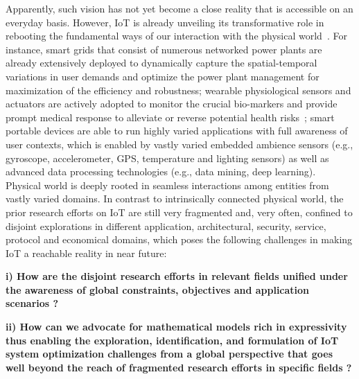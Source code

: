  Apparently, such vision has not yet become a close reality that is accessible on an everyday basis. However, IoT is already unveiling its transformative role in rebooting the fundamental ways of our interaction with the physical world~\cite{stankovic2014research,pajic2015attack,fawzi2014secure,clark2016submodularity}. For instance,  smart grids that consist of numerous networked power plants are already extensively deployed to dynamically capture the spatial-temporal variations in user demands and optimize the power plant management for maximization of the efficiency and robustness; wearable physiological sensors and actuators are actively adopted to monitor the crucial bio-markers and provide prompt medical response to alleviate or reverse potential health risks~\cite{bogdan2015cyber,bogdan2015cyber_2,ghorbani2013cyber,xue2016spatio,kumar2013mobile}; smart portable devices are able to run highly varied applications with full awareness of user contexts, which is enabled by vastly varied embedded ambience sensors (e.g., gyroscope, accelerometer, GPS, temperature and lighting sensors) as well as advanced data processing technologies (e.g., data mining, deep learning).\\
\indent Physical world is deeply rooted in seamless interactions among entities from vastly varied domains. In contrast to intrinsically connected physical world, the prior research efforts on IoT are still very fragmented and, very often, confined to disjoint explorations in different application, architectural, security, service, protocol and economical domains, which poses the following challenges in making IoT a reachable reality in near future: 

\noindent\textbf{i) How are the disjoint research efforts in relevant fields unified under the awareness of global constraints, objectives and application scenarios ?} 

\noindent\textbf{ii) How can we advocate for mathematical models rich in expressivity thus enabling the exploration, identification, and formulation of IoT system optimization challenges from a global perspective that goes well beyond the reach of fragmented research efforts in specific fields ? }

